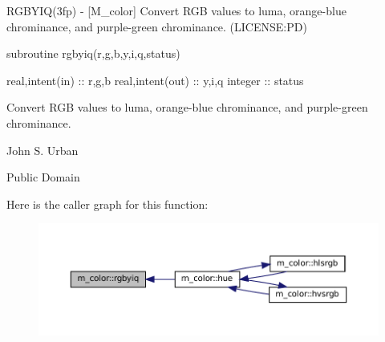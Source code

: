 \begin{DoxyDescription}
\item[\label{_RGBYIQ}%
N\+A\+ME ]R\+G\+B\+Y\+I\+Q(3fp) -\/ \mbox{[}M\+\_\+color\mbox{]} Convert R\+GB values to luma, orange-\/blue chrominance, and purple-\/green chrominance. (L\+I\+C\+E\+N\+SE\+:PD) 


\item[S\+Y\+N\+O\+P\+S\+IS ]
\begin{DoxyPre}
    subroutine rgbyiq(r,g,b,y,i,q,status)\end{DoxyPre}



\begin{DoxyPre}     real,intent(in)  :: r,g,b
     real,intent(out) :: y,i,q
     integer          :: status
    \end{DoxyPre}
 


\item[D\+E\+S\+C\+R\+I\+P\+T\+I\+ON ]Convert R\+GB values to luma, orange-\/blue chrominance, and purple-\/green chrominance. 


\item[A\+U\+T\+H\+OR ]

John S. Urban




\item[L\+I\+C\+E\+N\+SE ]

Public Domain




\end{DoxyDescription}Here is the caller graph for this function\+:\nopagebreak
\begin{figure}[H]
\begin{center}
\leavevmode
\includegraphics[width=350pt]{namespacem__color_a386d004a1392b7e01ff66f1676d43def_icgraph}
\end{center}
\end{figure}
\mbox{\label{namespacem__color_ac9cd845fb9975144a6deb3a21ce29a29}} 
